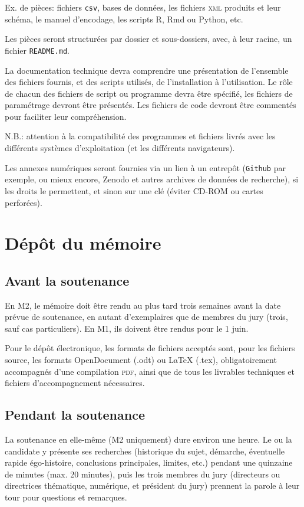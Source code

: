 \documentclass[a4paper,twoside,12pt]{book}
\begin{document}
Ex. de pièces: fichiers \texttt{csv}, bases de données, les fichiers \textsc{xml} produits et leur schéma, le manuel d'encodage, les scripts R, Rmd ou Python, etc.

Les pièces seront structurées par dossier et sous-dossiers, avec, à leur racine, un fichier \texttt{README.md}.

La documentation technique devra  comprendre une présentation de l'ensemble des fichiers fournis, et des scripts utilisés, 
de l'installation à l'utilisation.
Le rôle de chacun des fichiers de script ou programme devra être spécifié, les fichiers de paramétrage devront être présentés.
Les fichiers de code devront être commentés pour faciliter leur compréhension.

N.B.: attention à la compatibilité des programmes et fichiers livrés avec les différents systèmes d'exploitation (et les différents navigateurs).

Les annexes numériques seront fournies via un lien à un entrepôt (\texttt{Github} par exemple, ou mieux encore, Zenodo et autres archives de données de recherche), si les droits le permettent, et sinon sur une clé (éviter CD-ROM ou cartes perforées).

\section{Dépôt du mémoire}

\subsection{Avant la soutenance}

En M2, le mémoire doit être rendu au plus tard trois semaines avant la date prévue de soutenance, en autant  d'exemplaires que de membres du jury (trois, sauf cas particuliers). En M1, ils doivent être rendus pour le 1\ier{} juin.

Pour le dépôt électronique, les formats de fichiers acceptés sont, pour les fichiers source, les formats OpenDocument (.odt) ou \LaTeX{} (.tex), obligatoirement accompagnés d'une compilation \textsc{pdf}, ainsi que de tous les livrables techniques et fichiers d'accompagnement nécessaires.

\subsection{Pendant la soutenance}

La soutenance en elle-même (M2 uniquement) dure environ une heure. Le ou la candidate y présente ses recherches (historique du sujet, démarche, éventuelle rapide égo-histoire, conclusions principales, limites, etc.) pendant une quinzaine de minutes (max. 20 minutes), puis les trois membres du jury (directeurs ou directrices thématique, numérique, et président du jury) prennent la parole à leur tour pour questions et remarques.
\end{document}
